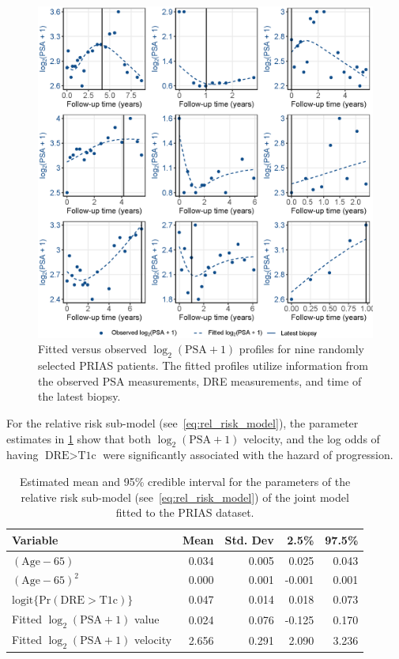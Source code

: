 \begin{figure}[!htb]
\centerline{\includegraphics[width=\columnwidth]{images/fitted_9subject_psa.eps}}
\caption{Fitted versus observed ${\log_2 (\mbox{PSA} + 1)}$ profiles for nine randomly selected PRIAS patients. The fitted profiles utilize information from the observed PSA measurements, DRE measurements, and time of the latest biopsy.}
\label{fig:fitted_9subject_psa}
\end{figure}

For the relative risk sub-model (see~\ref{eq:rel_risk_model}), the parameter estimates in \ref{tab:DRE_PSA_survival} show that both ${\log_2 (\mbox{PSA} + 1)}$ velocity,  and the log odds of having ${\mbox{DRE} > \mbox{T1c}}$  were significantly associated with the hazard of progression.  

\begin{table}[!htb]
\begin{center}
\caption{Estimated mean and 95\% credible interval for the parameters of the relative risk sub-model (see~\ref{eq:rel_risk_model}) of the joint model fitted to the PRIAS dataset.}
\label{tab:DRE_PSA_survival}
\begin{tabular}{lrrrr}
\hline
\hline
Variable                      & Mean   & Std. Dev & 2.5\%  & 97.5\% \\
\hline
$(\mbox{Age} - 65)$  & 0.034 & 0.005 & 0.025 & 0.043 \\
$(\mbox{Age} - 65)^2$ & 0.000 & 0.001 & -0.001 & 0.001 \\
$\mbox{logit} \big\{\mbox{Pr}(\mbox{DRE} > \mbox{T1c})\big\}$ & 0.047 & 0.014 & 0.018 & 0.073 \\
Fitted $\log_2 (\mbox{PSA} + 1)$ value  & 0.024 & 0.076 & -0.125 & 0.170\\
Fitted $\log_2 (\mbox{PSA} + 1)$ velocity  & 2.656 & 0.291 & 2.090 & 3.236 \\
\hline
\end{tabular}
\end{center}
\end{table}

